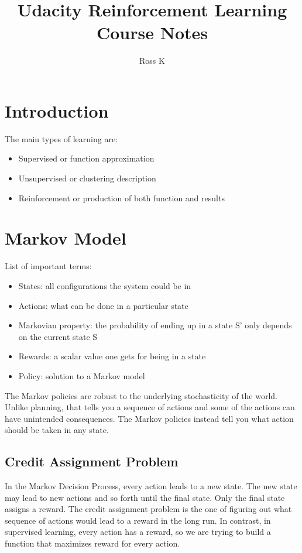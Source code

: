 \documentclass{article}
\title{Udacity Reinforcement Learning Course Notes}
\author{Ross K}
\begin{document}
\maketitle
\tableofcontents
\newpage
{}

\section{Introduction}
The main types of learning are:
\begin{itemize}
  \item Supervised or function approximation
  \item Unsupervised or clustering description
  \item Reinforcement or production of both function and results
\end{itemize}
\section{Markov Model}
List of important terms:
\begin{itemize}
  \item States: all configurations the system could be in
  \item Actions: what can be done in a particular state
  \item Markovian property: the probability of ending up in a state S’ only depends on the current state S
  \item Rewards: a scalar value one gets for being in a state
  \item Policy: solution to a Markov model
\end{itemize}
The Markov policies are robust to the underlying stochasticity of the world. Unlike planning, that tells you a sequence of actions and some of the actions can have unintended consequences. The Markov policies instead tell you what action should be taken in any state.
\subsection{Credit Assignment Problem}
In the Markov Decision Process, every action leads to a new state. The new state may lead to new actions and so forth until the final state. Only the final state assigns a reward. The credit assignment problem is the one of figuring out what sequence of actions would lead to a reward in the long run. In contrast, in supervised learning, every action has a reward, so we are trying to build a function that maximizes reward for every action.
\end{document}
